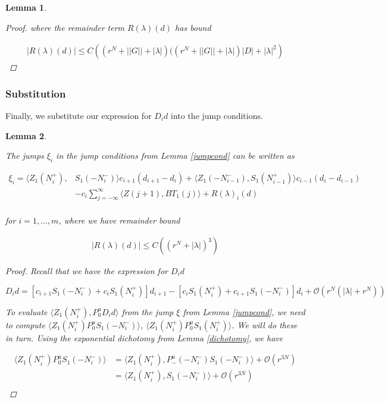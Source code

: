 \documentclass[12pt]{article}
\newtheorem{lemma}{Lemma}
\begin{document}
\begin{lemma}
\begin{proof}
where the remainder term $R(\lambda)(d)$ has bound

\begin{align*}
|R(\lambda)(d)| \leq C\left( (r^N + ||G|| + |\lambda|)( (r^N + ||G|| + |\lambda|)|D| + |\lambda|^2 \right)
\end{align*}

\end{proof}
\end{lemma}

\subsubsection{Substitution}

Finally, we substitute our expression for $D_i d$ into the jump conditions. 

\begin{lemma}\label{jumpcond2}

The jumps $\xi_i$ in the jump conditions from Lemma \ref{jumpcond} can be written as

\begin{align}\label{jumps}
\xi_i = \langle Z_1(N_i^+), &S_1(-N_i^-) \rangle c_{i+1}( d_{i+1} - d_i) 
+ \langle Z_1(-N_{i-1}^-), S_1(N_{i-1}^+) \rangle c_{i-1}( d_i - d_{i-1}) \\
&- c_i \sum_{j = -\infty}^{\infty} \langle Z(j+1), B T_1(j)\rangle + R(\lambda)_i(d) \\
\end{align}

for $i = 1, \dots, m$, where we have remainder bound

\begin{align*}
|R(\lambda)(d)| \leq C\left( (r^N + |\lambda|)^3 \right)
\end{align*}

\begin{proof}
Recall that we have the expression for $D_i d$

\[
D_i d = [ c_{i+1} S_1(-N_i^-) + c_i S_1(N_i^+) ] d_{i+1}
- [ c_i S_1(N_i^+) + c_{i+1} S_1(-N_i^-) ] d_i 
+\mathcal{O}(r^N( |\lambda| + r^N))
\]

To evaluate $\langle Z_1(N_i^+), P_0^u D_i d \rangle$ from the jump $\xi$ from Lemma \ref{jumpcond}, we need to compute $\langle Z_1(N_i^+) P_0^u S_1(-N_i^-) \rangle$, $\langle Z_1(N_i^+) P_0^u S_1(N_i^+) \rangle$. We will do these in turn. Using the exponential dichotomy from Lemma \ref{dichotomy}, we have

\begin{align*}
\langle Z_1(N_i^+) P_0^u S_1(-N_i^-) \rangle
&= \langle Z_1(N_i^+), P_-^u(-N_i^-) S_1(-N_i^-) \rangle + \mathcal{O}(r^{3N}) \\
&= \langle Z_1(N_i^+), S_1(-N_i^-) \rangle + \mathcal{O}(r^{3N}) \\
\end{align*}


\end{proof}
\end{lemma}
\end{document}
